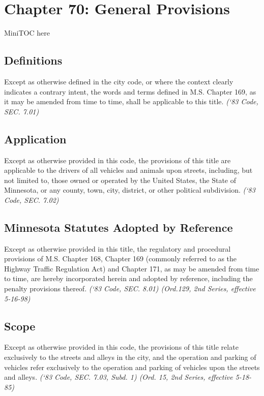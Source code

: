 \documentclass[code.tex]{subfiles}
\begin{document}
\chapter*{Chapter 70: \newline
	General Provisions}

MiniTOC here
\pagebreak

\section{Definitions}
Except as otherwise defined in the city code, or where the context clearly indicates a contrary intent, the words and terms defined in M.S. Chapter 169, as it may be amended from time to time, shall be applicable to this title.\newline
\emph{(‘83 Code, SEC. 7.01)}
\section{Application}
Except as otherwise provided in this code, the provisions of this title are applicable to the drivers of all vehicles and animals upon streets, including, but not limited to, those owned or operated by the United States, the State of Minnesota, or any county, town, city, district, or other political subdivision.\newline
\emph{(‘83 Code, SEC. 7.02)}
\section{Minnesota Statutes Adopted by Reference}
Except as otherwise provided in this title, the regulatory and procedural provisions of M.S. Chapter 168, Chapter 169 (commonly referred to as the Highway Traffic Regulation Act) and Chapter 171, as may be amended from time to time, are hereby incorporated herein and adopted by reference, including the penalty provisions thereof.\newline
\emph{(‘83 Code, SEC. 8.01) (Ord.129, 2nd Series, effective 5-16-98)}
\section{Scope}
Except as otherwise provided in this code, the provisions of this title relate exclusively to the streets and alleys in the city, and the operation and parking of vehicles refer exclusively to the operation and parking of vehicles upon the streets and alleys.\newline
\emph{(‘83 Code, SEC. 7.03, Subd. 1) (Ord. 15, 2nd Series, effective 5-18-85)}
\end{document}
